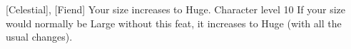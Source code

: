  {[Celestial], [Fiend]}
\shortdescfeat
{Your size increases to Huge.}
{Character level 10}
{If your size would normally be Large without this feat, it increases to Huge (with all the usual changes).}